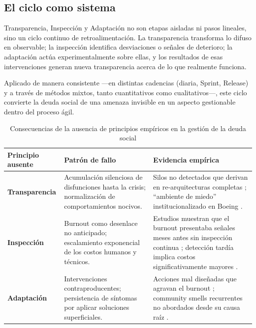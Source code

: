 \FloatBarrier

\subsection{El ciclo como sistema}

Transparencia, Inspección y Adaptación no son etapas aisladas ni pasos lineales, sino un ciclo continuo de retroalimentación.
La transparencia transforma lo difuso en observable; la inspección identifica desviaciones o señales de deterioro; la adaptación actúa experimentalmente sobre ellas, y los resultados de esas intervenciones generan nueva transparencia acerca de lo que realmente funciona.

Aplicado de manera consistente —en distintas cadencias (diaria, Sprint, Release) y a través de métodos mixtos, tanto cuantitativos como cualitativos—, este ciclo convierte la deuda social de una amenaza invisible en un aspecto gestionable dentro del proceso ágil.

\begin{table}[htb]
    \caption{Consecuencias de la ausencia de principios empíricos en la gestión de la deuda social}
    \label{tab:consecuencias_ausencia}
    \centering
    \small
    \begin{tabular}{@{}p{3cm}p{5.5cm}p{5cm}@{}}
        \toprule
        \textbf{Principio ausente}                                                                        & \textbf{Patrón de fallo} & \textbf{Evidencia empírica}                                                 \\
        \midrule
        \textbf{Transparencia}                                                                            &
        Acumulación silenciosa de disfunciones hasta la crisis; normalización de comportamientos nocivos. &
        Silos no detectados que derivan en re-arquitecturas completas \cite{tamburri2015insights}; ``ambiente de miedo'' institucionalizado en Boeing \cite{saeeda2024nontechnicaldebt}.                           \\
        \addlinespace
        \textbf{Inspección}                                                                               &
        Burnout como desenlace no anticipado; escalamiento exponencial de los costos humanos y técnicos.  &
        Estudios muestran que el burnout presentaba señales meses antes sin inspección continua \cite{tulili2022burnout}; detección tardía implica costos significativamente mayores \cite{dreesen2021socialdebt}. \\
        \addlinespace

        \textbf{Adaptación}                                                                               &
        Intervenciones contraproducentes; persistencia de síntomas por aplicar soluciones superficiales.  &
        Acciones mal diseñadas que agravan el burnout \cite{martini2019agiledebt}; community smells recurrentes no abordados desde su causa raíz \cite{caballero2022communitysmells}.                              \\
        \bottomrule
    \end{tabular}
\end{table}

